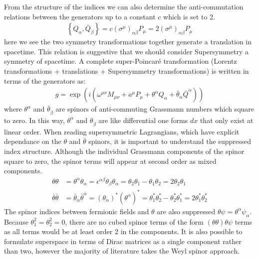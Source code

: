 From the structure of the indices we can also determine the anti-commutation relations between the
 generators up to a constant $c$ which is set to 2. 
\begin{align*}
\left \{ Q_\alpha, \bar{Q}_{\dot{\beta}}\right \} = c( \sigma^\mu)_{\alpha \dot{\beta}} P_\mu  = 2( \sigma^\mu)_{\alpha \dot{\beta}} P_\mu 
\end{align*}
here we see the two symmetry transformations together generate a translation in spacetime. This relation is suggestive that we should
 consider Supersymmetry a symmetry of spacetime. A complete super-Poincar\'{e} transformation (Lorentz transformations + translations + Supersymmetry transformations) is written in terms of the generators as:
\begin{align*}
g = \exp \left ( i ( \omega^{\mu\nu} M_{\mu\nu}  + a^\mu P_\mu + \theta^\alpha Q_\alpha + \bar{\theta}_{\dot{\alpha}}\bar{Q}^{\dot{\alpha}}) \right )
\end{align*}
where $\theta^\alpha$ and $\bar{\theta}_{\dot{\beta}}$ are spinors of anti-commuting Grassmann numbers
 which square to zero. In this way, $\theta^\alpha$ and $\theta_{\dot{\beta}}$ are like differential one 
forms $dx$ that only exist at linear order. When reading supersymmetric Lagrangians, which have explicit 
dependance on the $\theta$ and $\bar{\theta}$ spinors, it is important to understand the suppressed index structure. Although the 
individual Grassmann components of the spinor square to zero, the spinor terms will appear at second order as mixed components. 
\begin{align*}
\theta\theta &= \theta^\alpha \theta_\alpha = \epsilon^{\alpha\beta} \theta_\beta \theta_\alpha =  \theta_2 \theta_1 - \theta_1 \theta_2 = 2 \theta_2 \theta_1 \\
\bar\theta\bar{\theta} &= \bar{\theta}_{\dot{\alpha}} \bar{\theta}^{\dot{\alpha}} = (\theta_{\dot{\alpha}})^* (\theta^{\dot{\alpha}})^* = \theta_1^* \theta_2^* - \theta_2^* \theta_1^* = 2 \theta_1^* \theta_2^*
\end{align*}
The spinor indices between fermionic fields and $\theta$ are also suppressed $\theta\psi = \theta^\alpha \psi_\alpha$. 
Because $\theta_1^2=\theta_2^2=0$, there are no cubed spinor terms of the form $(\theta\theta)\theta\psi$ terms as all terms would be
at least order 2 in the components. It is also possible to formulate superspace in terms of Dirac matrices as a single component rather than two, however the majority of literature takes the Weyl spinor approach.

